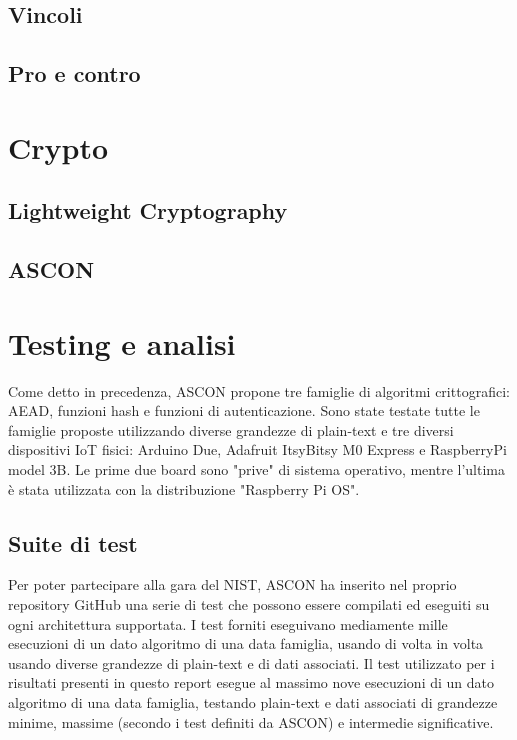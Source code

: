 \documentclass[12pt,a4paper,italian]{report}
\begin{document}
\section{Vincoli}

\section{Pro e contro}

\newpage

\chapter{Crypto}

\section{Lightweight Cryptography}

\section{ASCON}

\newpage

\chapter{Testing e analisi}

Come detto in precedenza, ASCON propone tre famiglie di algoritmi crittografici: AEAD, funzioni hash e funzioni di autenticazione. Sono state testate tutte le famiglie proposte utilizzando diverse grandezze di plain-text e tre diversi dispositivi IoT fisici: Arduino Due, Adafruit ItsyBitsy M0 Express e RaspberryPi model 3B. Le prime due board sono "prive" di sistema operativo, mentre l'ultima è stata utilizzata con la distribuzione "Raspberry Pi OS".

\section{Suite di test}

Per poter partecipare alla gara del NIST, ASCON ha inserito nel proprio repository GitHub una serie di test che possono essere compilati ed eseguiti su ogni architettura supportata. I test forniti eseguivano mediamente mille esecuzioni di un dato algoritmo di una data famiglia, usando di volta in volta usando diverse grandezze di plain-text e di dati associati. Il test utilizzato per i risultati presenti in questo report esegue al massimo nove esecuzioni di un dato algoritmo di una data famiglia, testando plain-text e dati associati di grandezze minime, massime (secondo i test definiti da ASCON) e intermedie significative.
\end{document}
